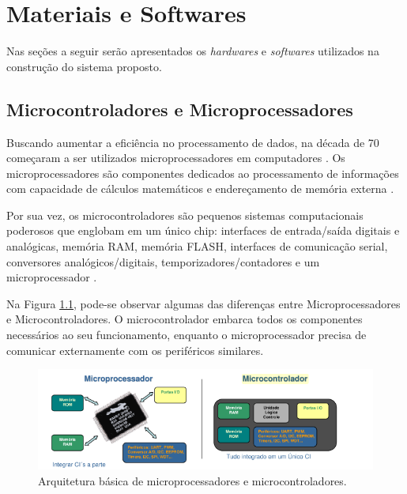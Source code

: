 \chapter{Materiais e Softwares}
Nas seções a seguir serão apresentados os \textit{hardwares} e \textit{softwares} utilizados na construção do sistema proposto.
\section{Microcontroladores e Microprocessadores}

Buscando aumentar a eficiência no processamento de dados, na década de 70
começaram a ser utilizados microprocessadores em computadores \cite{martins2005sistemas}. Os microprocessadores são componentes dedicados ao processamento de informações com
capacidade de cálculos matemáticos e endereçamento de memória externa \cite{chase2007sistemas}.

Por sua vez, os microcontroladores são pequenos sistemas computacionais poderosos que englobam em um único chip: interfaces de entrada/saída digitais e analógicas, memória RAM, memória FLASH, interfaces de comunicação serial, conversores analógicos/digitais, temporizadores/contadores e um microprocessador \cite{chase2007sistemas}.

Na Figura \ref{fig:microprocessador-microcontrolador}, pode-se observar algumas das diferenças entre Microprocessadores e Microcontroladores. O microcontrolador embarca todos os componentes necessários ao seu funcionamento, enquanto o microprocessador precisa de comunicar externamente com os periféricos similares.

\begin{figure}[htbp]
	\centering
	\includegraphics[scale=0.7]{figuras/processa-controla.png}
	\caption{Arquitetura básica de microprocessadores e microcontroladores.}
	\label{fig:microprocessador-microcontrolador}
\end{figure}

\newpage

